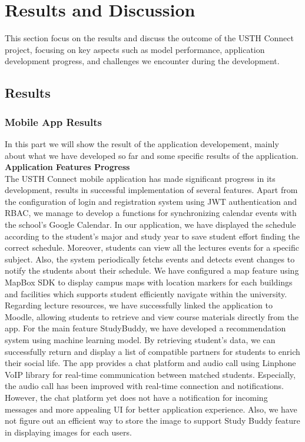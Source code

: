 \documentclass[12pt]{article}
\begin{document}
\pagebreak

\section{Results and Discussion}
This section focus on the results and discuss the outcome of the USTH Connect project, focusing on key aspects such as model performance, application development progress, and challenges we encounter during the development.
\subsection{Results}

\subsubsection{Mobile App Results}
In this part we will show the result of the application developement, mainly about what we have developed so far and some specific results of the application. \\

\textbf{Application Features Progress} \\

The USTH Connect mobile application has made significant progress in its development, results in successful implementation of several features.
Apart from the configuration of login and registration system using JWT authentication and RBAC, we manage to develop a functions for synchronizing calendar events with the school's Google Calendar.
In our application, we have displayed the schedule according to the student's major and study year to save student effort finding the correct schedule. 
Moreover, students can view all the lectures events for a specific subject. Also, the system periodically fetchs events and detects event changes to notify the students about their schedule.
We have configured a map feature using MapBox SDK to display campus maps with location markers for each buildings and facilities which supports student efficiently navigate within the university.
Regarding lecture resources, we have successfully linked the application to Moodle, allowing students to retrieve and view course materials directly from the app.
For the main feature StudyBuddy, we have developed a recommendation system using machine learning model. By retrieving student's data, we can successfully return and display a list of compatible partners for students to enrich their social life.
The app provides a chat platform and audio call using Linphone VoIP library for real-time communication between matched students. Especially, the audio call has been improved with real-time connection and notifications. 
However, the chat platform yet does not have a notification for incoming messages and more appealing UI for better application experience.
Also, we have not figure out an efficient way to store the image to support Study Buddy feature in displaying images for each users. \\
\end{document}
